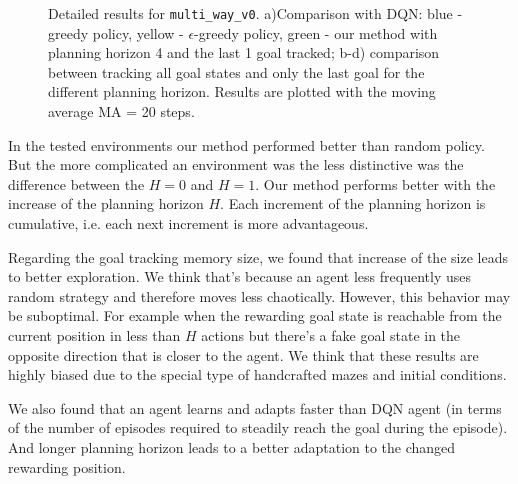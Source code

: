 \documentclass[runningheads]{llncs}
\begin{document}
\begin{figure}
  \centering
  \begin{minipage}{.49\linewidth}
    
  \end{minipage}
  \begin{minipage}{.49\linewidth}
    
  \end{minipage}
  
  \begin{minipage}{.49\linewidth}
    
  \end{minipage}
  \begin{minipage}{.49\linewidth}
    
  \end{minipage}

  \caption{Detailed results for \texttt{multi\_way\_v0}. a)Comparison with DQN: blue - greedy policy, yellow - $\epsilon$-greedy policy, green - our method with planning horizon 4 and the last 1 goal tracked; b-d) comparison between tracking all goal states and only the last goal for the different planning horizon. Results are plotted with the moving average MA = 20 steps.} \label{fig_detailed_mw0}
\end{figure}

In the tested environments our method performed better than random policy. But the more complicated an environment was the less distinctive was the difference between the $H = 0$ and $H = 1$. Our method performs better with the increase of the planning horizon $H$. Each increment of the planning horizon is cumulative, i.e. each next increment is more advantageous.

Regarding the goal tracking memory size, we found that increase of the size leads to better exploration. We think that's because an agent less frequently uses random strategy and therefore moves less chaotically. However, this behavior may be suboptimal. For example when the rewarding goal state is reachable from the current position in less than $H$ actions but there's a fake goal state in the opposite direction that is closer to the agent. We think that these results are highly biased due to the special type of handcrafted mazes and initial conditions.
  
We also found that an agent learns and adapts faster than DQN agent (in terms of the number of episodes required to steadily reach the goal during the episode). And longer planning horizon leads to a better adaptation to the changed rewarding position.
\end{document}
